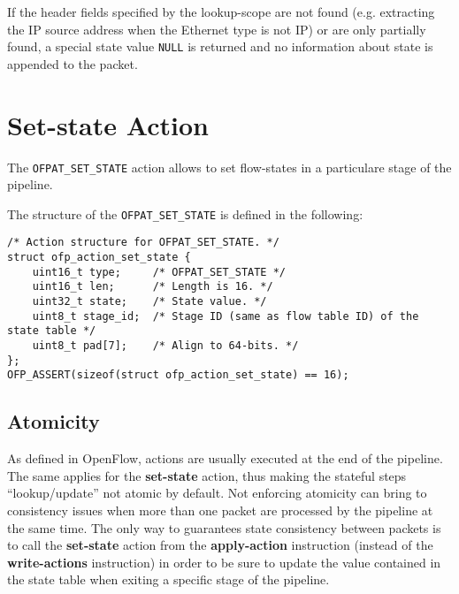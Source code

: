 If the header fields specified by the lookup-scope are not found (e.g. extracting the IP source address when the Ethernet type is not IP) or are only partially found, a special state value \texttt{NULL} is returned and no information about state is appended to the packet.

\section{Set-state Action}
\label{sec:act_set_state}

The \texttt{OFPAT\_SET\_STATE} action allows to set flow-states in a particulare stage of the pipeline.

The structure of the \texttt{OFPAT\_SET\_STATE} is defined in the following:

\begin{verbatim}
/* Action structure for OFPAT_SET_STATE. */
struct ofp_action_set_state {
    uint16_t type;     /* OFPAT_SET_STATE */
    uint16_t len;      /* Length is 16. */
    uint32_t state;    /* State value. */
    uint8_t stage_id;  /* Stage ID (same as flow table ID) of the state table */
    uint8_t pad[7];    /* Align to 64-bits. */
};
OFP_ASSERT(sizeof(struct ofp_action_set_state) == 16);
\end{verbatim}


\subsection{Atomicity}
As defined in OpenFlow, actions are usually executed at the end of the pipeline. The same applies for the \textbf{set-state} action, thus making the stateful steps ``lookup/update'' not atomic by default. Not enforcing atomicity can bring to consistency issues when more than one packet are processed by the pipeline at the same time. The only way to guarantees state consistency between packets is to call the \textbf{set-state} action from the \textbf{apply-action} instruction (instead of the \textbf{write-actions} instruction) in order to be sure to update the value contained in the state table when exiting a specific stage of the pipeline.

